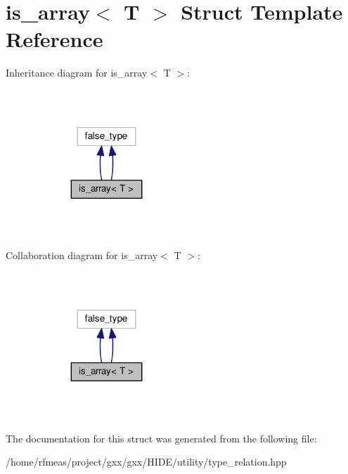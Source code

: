 \hypertarget{structis__array}{}\section{is\+\_\+array$<$ T $>$ Struct Template Reference}
\label{structis__array}


Inheritance diagram for is\+\_\+array$<$ T $>$\+:
\nopagebreak
\begin{figure}[H]
\begin{center}
\leavevmode
\includegraphics[width=155pt]{structis__array__inherit__graph}
\end{center}
\end{figure}


Collaboration diagram for is\+\_\+array$<$ T $>$\+:
\nopagebreak
\begin{figure}[H]
\begin{center}
\leavevmode
\includegraphics[width=155pt]{structis__array__coll__graph}
\end{center}
\end{figure}


The documentation for this struct was generated from the following file\+:\begin{DoxyCompactItemize}
\item 
/home/rfmeas/project/gxx/gxx/\+H\+I\+D\+E/utility/type\+\_\+relation.\+hpp\end{DoxyCompactItemize}
